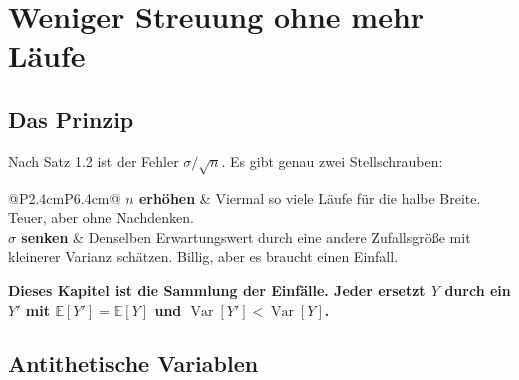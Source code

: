 \chapter{Weniger Streuung ohne mehr Läufe}

\section{Das Prinzip}

\begin{merksatz}
Nach Satz 1.2 ist der Fehler $\sigma/\sqrt n$. Es gibt genau zwei Stellschrauben:

\begin{center}
{\small
\renewcommand{\arraystretch}{1.5}
\begin{tabular}{@{}P{2.4cm}P{6.4cm}@{}}
\toprule
\textbf{$n$ erhöhen} & Viermal so viele Läufe für die halbe Breite. Teuer, aber ohne Nachdenken.\\
\textbf{$\sigma$ senken} & Denselben Erwartungswert durch eine andere Zufallsgröße mit kleinerer Varianz schätzen. Billig, aber es braucht einen Einfall.\\
\bottomrule
\end{tabular}}
\end{center}

\begin{center}
\begin{minipage}{0.9\textwidth}
\textbf{Dieses Kapitel ist die Sammlung der Einfälle. Jeder ersetzt $Y$ durch ein $Y'$ mit $\mathbb E[Y'] = \mathbb E[Y]$ und $\operatorname{Var}[Y'] < \operatorname{Var}[Y]$.}
\end{minipage}
\end{center}

\begin{center}
\begin{minipage}{0.88\textwidth}
\end{minipage}
\end{center}
\end{merksatz}

\section{Antithetische Variablen}

